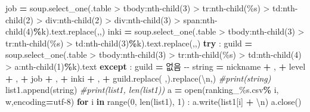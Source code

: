 \documentclass[
]{article}
\newenvironment{Shaded}{\begin{snugshade}}{\end{snugshade}}
\newcommand{\BuiltInTok}[1]{#1}
\newcommand{\CharTok}[1]{\textcolor[rgb]{0.31,0.60,0.02}{#1}}
\newcommand{\CommentTok}[1]{\textcolor[rgb]{0.56,0.35,0.01}{\textit{#1}}}
\newcommand{\ControlFlowTok}[1]{\textcolor[rgb]{0.13,0.29,0.53}{\textbf{#1}}}
\newcommand{\DecValTok}[1]{\textcolor[rgb]{0.00,0.00,0.81}{#1}}
\newcommand{\KeywordTok}[1]{\textcolor[rgb]{0.13,0.29,0.53}{\textbf{#1}}}
\newcommand{\NormalTok}[1]{#1}
\newcommand{\OperatorTok}[1]{\textcolor[rgb]{0.81,0.36,0.00}{\textbf{#1}}}
\newcommand{\SpecialCharTok}[1]{\textcolor[rgb]{0.00,0.00,0.00}{#1}}
\newcommand{\StringTok}[1]{\textcolor[rgb]{0.31,0.60,0.02}{#1}}
\begin{document}
\begin{Shaded}
\begin{Highlighting}[]
\NormalTok{            job }\OperatorTok{=}\NormalTok{ soup.select\_one(}\StringTok{\textquotesingle{}.table \textgreater{} tbody:nth{-}child(3) \textgreater{} tr:nth{-}child(}\SpecialCharTok{\%s}\StringTok{) \textgreater{} td:nth{-}child(2) \textgreater{} div:nth{-}child(2) \textgreater{} div:nth{-}child(3) \textgreater{} span:nth{-}child(4)\textquotesingle{}}\OperatorTok{\%}\NormalTok{k).text.replace(}\StringTok{\textquotesingle{},\textquotesingle{}}\NormalTok{,}\StringTok{\textquotesingle{}\textquotesingle{}}\NormalTok{)}
\NormalTok{            inki }\OperatorTok{=}\NormalTok{ soup.select\_one(}\StringTok{\textquotesingle{}.table \textgreater{} tbody:nth{-}child(3) \textgreater{} tr:nth{-}child(}\SpecialCharTok{\%s}\StringTok{) \textgreater{} td:nth{-}child(3)\textquotesingle{}}\OperatorTok{\%}\NormalTok{k).text.replace(}\StringTok{\textquotesingle{},\textquotesingle{}}\NormalTok{,}\StringTok{\textquotesingle{}\textquotesingle{}}\NormalTok{)}
            \ControlFlowTok{try}\NormalTok{ :}
\NormalTok{                guild }\OperatorTok{=}\NormalTok{ soup.select\_one(}\StringTok{\textquotesingle{}.table \textgreater{} tbody:nth{-}child(3) \textgreater{} tr:nth{-}child(}\SpecialCharTok{\%s}\StringTok{) \textgreater{} td:nth{-}child(4) \textgreater{} a:nth{-}child(1)\textquotesingle{}}\OperatorTok{\%}\NormalTok{k).text}
            \ControlFlowTok{except}\NormalTok{ :}
\NormalTok{                guild }\OperatorTok{=} \StringTok{\textquotesingle{}{-}{-} 없음 {-}{-}\textquotesingle{}}
\NormalTok{            string }\OperatorTok{=}\NormalTok{ nickname }\OperatorTok{+} \StringTok{\textquotesingle{},\textquotesingle{}} \OperatorTok{+}\NormalTok{ level }\OperatorTok{+} \StringTok{\textquotesingle{},\textquotesingle{}} \OperatorTok{+}\NormalTok{ job }\OperatorTok{+} \StringTok{\textquotesingle{},\textquotesingle{}} \OperatorTok{+}\NormalTok{ inki }\OperatorTok{+} \StringTok{\textquotesingle{},\textquotesingle{}} \OperatorTok{+}\NormalTok{ guild.replace(}\StringTok{\textquotesingle{} \textquotesingle{}}\NormalTok{,}\StringTok{\textquotesingle{}\textquotesingle{}}\NormalTok{).replace(}\StringTok{\textquotesingle{}}\CharTok{\textbackslash{}n}\StringTok{\textquotesingle{}}\NormalTok{,}\StringTok{\textquotesingle{}\textquotesingle{}}\NormalTok{)}
            \CommentTok{\#print(string)}
\NormalTok{            list1.append(string)}
        \CommentTok{\#print(list1, len(list1))}
\NormalTok{    a }\OperatorTok{=} \BuiltInTok{open}\NormalTok{(}\StringTok{\textquotesingle{}ranking\_}\SpecialCharTok{\%s}\StringTok{.csv\textquotesingle{}}\OperatorTok{\%}\NormalTok{ i, }\StringTok{\textquotesingle{}w\textquotesingle{}}\NormalTok{,encoding}\OperatorTok{=}\StringTok{\textquotesingle{}utf{-}8\textquotesingle{}}\NormalTok{)}
    \ControlFlowTok{for}\NormalTok{ i }\KeywordTok{in} \BuiltInTok{range}\NormalTok{(}\DecValTok{0}\NormalTok{, }\BuiltInTok{len}\NormalTok{(list1), }\DecValTok{1}\NormalTok{) :}
\NormalTok{        a.write(list1[i] }\OperatorTok{+} \StringTok{\textquotesingle{}}\CharTok{\textbackslash{}n}\StringTok{\textquotesingle{}}\NormalTok{)}
\NormalTok{    a.close()}
\end{Highlighting}
\end{Shaded}
\end{document}
